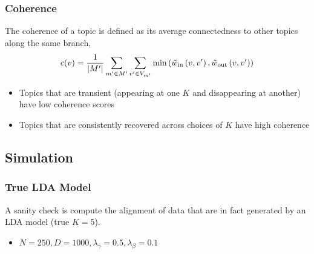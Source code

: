 \documentclass{beamer}
\begin{document}
\begin{frame}
  \frametitle{Coherence}
  The coherence of a topic is defined as its average connectedness to other
  topics along the same branch,
  \begin{align*}
    c(v) = \frac{1}{|M'|} \sum_{m' \in M'} \sum_{v' \in V_{m'}} \min\left(\tilde w_{\text{in}}\left(v, v'\right), \tilde w_{\text{out}}\left(v, v'\right) \right)
  \end{align*}
  \begin{itemize}
    \item Topics that are transient (appearing at one $K$ and disappearing at
    another) have low coherence scores
    \item Topics that are consistently recovered across choices of $K$ have high
    coherence
  \end{itemize}

\end{frame}

\subsection{Simulation}
\begin{frame}
  \frametitle{True LDA Model}
  A sanity check is compute the alignment of data that are in fact generated by an
  LDA model (true $K = 5$).
  \begin{itemize}
  \item $N = 250, D = 1000, \lambda_{\gamma} = 0.5, \lambda_{\beta} = 0.1$
  \end{itemize}

  \begin{figure}
  \end{figure}
\end{frame}
\end{document}
